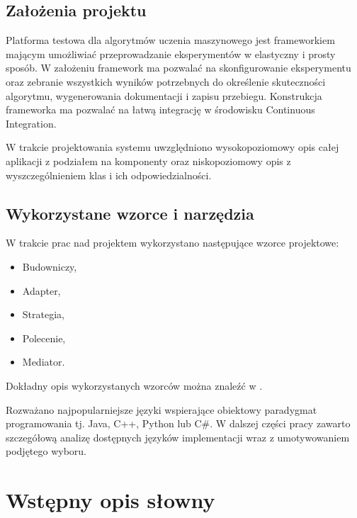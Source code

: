 \documentclass[12pt]{article}
\begin{document}
\subsection{Założenia projektu}

Platforma testowa dla algorytmów uczenia maszynowego jest frameworkiem mającym umożliwiać przeprowadzanie eksperymentów w elastyczny i prosty sposób. W założeniu framework ma pozwalać na skonfigurowanie eksperymentu oraz zebranie wszystkich wyników potrzebnych do określenie skuteczności algorytmu, wygenerowania dokumentacji i zapisu przebiegu. Konstrukcja frameworka ma pozwalać na łatwą integrację w środowisku Continuous Integration.

W trakcie projektowania systemu uwzględniono wysokopoziomowy opis całej aplikacji z podziałem na komponenty oraz niskopoziomowy opis z wyszczególnieniem klas i ich odpowiedzialności.

\subsection{Wykorzystane wzorce i narzędzia}

W trakcie prac nad projektem wykorzystano następujące wzorce projektowe:

\begin{itemize}
	\item Budowniczy,
	\item Adapter,
	\item Strategia,
	\item Polecenie,
	\item Mediator.
\end{itemize}

Dokładny opis wykorzystanych wzorców można znaleźć w \cite{gang-of-four}.

Rozważano najpopularniejsze języki wspierające obiektowy paradygmat programowania tj. Java, C++, Python lub C\#. W dalszej części pracy zawarto szczegółową analizę dostępnych języków implementacji wraz z umotywowaniem podjętego wyboru. 


\section{Wstępny opis słowny}
\end{document}
